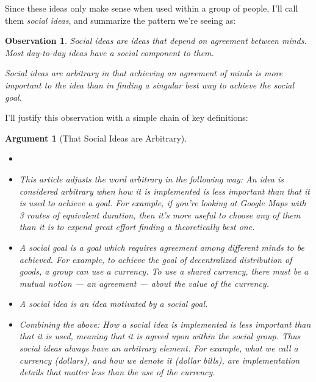 \documentclass[11pt, oneside]{article}   	%
\newtheorem{obs}{Observation}
\newtheorem{argt}{Argument}
\begin{document}
Since these ideas only make sense when used within a group of people,
I'll call them {\em
social ideas}, and summarize the pattern we're seeing as:
\begin{obs}\label{o8}
    Social ideas are ideas that depend on agreement between minds.
    Most day-to-day ideas
    have a social component to them.

    Social ideas are {\em arbitrary} in that achieving an agreement of minds is
    more
    important to the idea than in finding a singular best way
    to achieve the social goal.
\end{obs}

I'll justify this observation with a simple chain of key definitions:

\begin{argt}[That Social Ideas are Arbitrary]
    \label{a5}
    \normalfont
    \begin{itemize}
        \item[]
        \item This article adjusts the word {\em arbitrary} in the following
            way: An idea is considered arbitrary when {\em how}
            it is implemented is
            less important than {\em that it is used} to achieve a goal.
            For
            example, if you're looking at Google Maps with 3 routes of
            equivalent
            duration, then it's more useful to choose any of them than it
            is to expend great effort finding a theoretically best one.
        \item A social {\em goal}
            is a goal which requires agreement among different
            minds to be achieved. For example, to achieve the goal of
            decentralized distribution of goods, a group can use a currency.
            To use a shared currency, there must be a mutual notion --- an
            agreement --- about the value of the currency.
        \item A social {\em idea} is an idea motivated by a social goal.
        \item Combining the above:
            {\em How} a social idea is implemented is less important than
            {\em that} it is
            used, meaning that it is agreed upon within the social group.
            Thus social ideas always have an arbitrary element.
            For example, what we call a
            currency (dollars), and how we denote it (dollar bills), are
            implementation details that matter less than the use of the
            currency.
    \end{itemize}
\end{argt}
\end{document}
